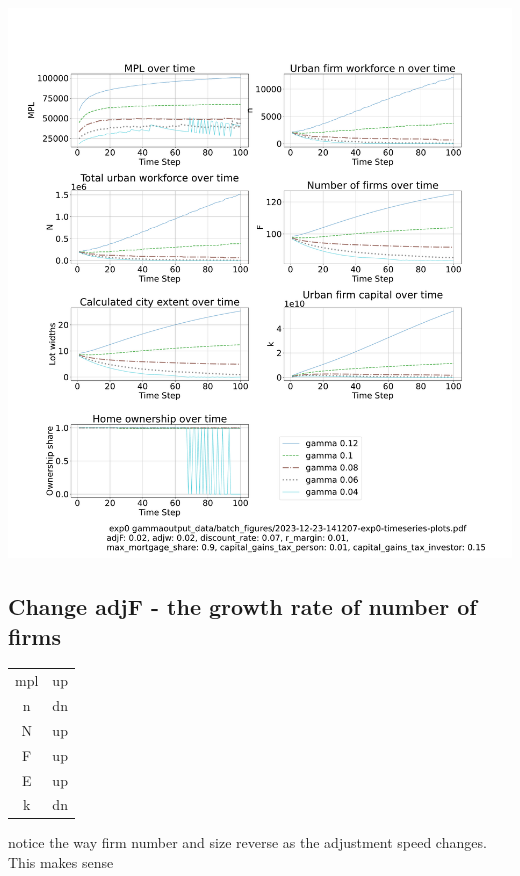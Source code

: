 
 \hspace*{-2.5cm}\includegraphics[trim= 1.5cm 3.65cm 2cm 4.0cm, clip, scale=.3]{fig/Analysis/Gamma-low-5-30.pdf}

\newpage %

\subsection{Change adjF - the growth rate of number of firms }

\begin{multicols}{2}
\begin{tabular}{c|c}
  mpl   &  up\\
  n   &  dn\\
  N   &  up\\
  F   & up \\
  E   &  up\\
  k   & dn
\end{tabular}

  notice the way firm number and size reverse as the adjustment speed changes. This makes sense
  
\end{multicols}

